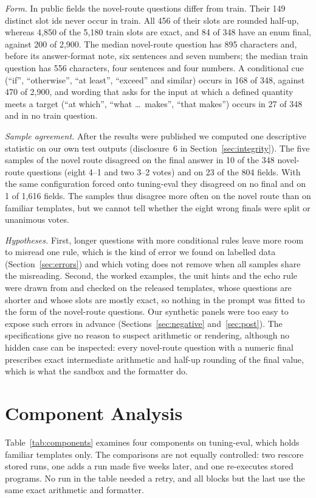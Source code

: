 \documentclass[conference]{IEEEtran}
\begin{document}
\emph{Form.} In public fields the novel-route questions differ from train. Their 149 distinct slot ids never occur in train. All 456 of their slots are rounded half-up, whereas 4,850 of the 5,180 train slots are exact, and 84 of 348 have an enum final, against 200 of 2,900. The median novel-route question has 895 characters and, before its answer-format note, six sentences and seven numbers; the median train question has 556 characters, four sentences and four numbers. A conditional cue (``if'', ``otherwise'', ``at least'', ``exceed'' and similar) occurs in 168 of 348, against 470 of 2,900, and wording that asks for the input at which a defined quantity meets a target (``at which'', ``what \ldots\ makes'', ``that makes'') occurs in 27 of 348 and in no train question.

\emph{Sample agreement.} After the results were published we computed one descriptive statistic on our own test outputs (disclosure~6 in Section~\ref{sec:integrity}). The five samples of the novel route disagreed on the final answer in 10 of the 348 novel-route questions (eight 4--1 and two 3--2 votes) and on 23 of the 804 fields. With the same configuration forced onto tuning-eval they disagreed on no final and on 1 of 1,616 fields. The samples thus disagree more often on the novel route than on familiar templates, but we cannot tell whether the eight wrong finals were split or unanimous votes.

\emph{Hypotheses.} First, longer questions with more conditional rules leave more room to misread one rule, which is the kind of error we found on labelled data (Section~\ref{sec:errors}) and which voting does not remove when all samples share the misreading. Second, the worked examples, the unit hints and the echo rule were drawn from and checked on the released templates, whose questions are shorter and whose slots are mostly exact, so nothing in the prompt was fitted to the form of the novel-route questions. Our synthetic panels were too easy to expose such errors in advance (Sections~\ref{sec:negative} and~\ref{sec:post}). The specifications give no reason to suspect arithmetic or rendering, although no hidden case can be inspected: every novel-route question with a numeric final prescribes exact intermediate arithmetic and half-up rounding of the final value, which is what the sandbox and the formatter do.

\section{Component Analysis}\label{sec:components}

Table~\ref{tab:components} examines four components on tuning-eval, which holds familiar templates only. The comparisons are not equally controlled: two rescore stored runs, one adds a run made five weeks later, and one re-executes stored programs. No run in the table needed a retry, and all blocks but the last use the same exact arithmetic and formatter.
\end{document}
